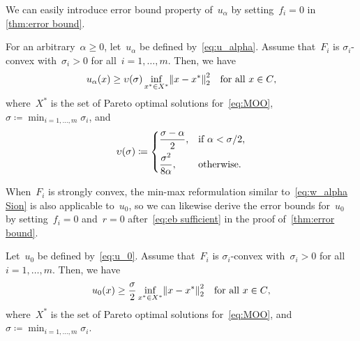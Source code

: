 \documentclass[../main]{subfiles}
\begin{document}
We can easily introduce error bound property of~$u_\alpha$ by setting~$f_i = 0$ in \cref{thm:error bound}.

\begin{corollary} \label{thm:eb_cor}
    For an arbitrary~$\alpha \ge 0$, let~$u_\alpha$ be defined by~\cref{eq:u_alpha}.
    Assume that~$F_i$ is $\sigma_i$-convex with~$\sigma_i > 0$ for all~$i = 1, \dots, m$.
    Then, we have
    \[
        u_\alpha(x) \ge \upsilon(\sigma) \inf_{x^\ast \in X^\ast} \norm*{x - x^\ast}_2^2 \forallcondition{x \in C}
    ,\]
    where~$X^\ast$ is the set of Pareto optimal solutions for~\cref{eq:MOO},~$\sigma \coloneqq \min_{i = 1, \dots, m} \sigma_i$, and
    \[
        \upsilon(\sigma) \coloneqq \begin{dcases}
            \frac{\sigma - \alpha}{2}, & \text{if } \alpha < \sigma / 2, \\
            \frac{\sigma^2}{8 \alpha}, & \text{otherwise}
        .\end{dcases}
    \] 
\end{corollary}

When~$F_i$ is strongly convex, the min-max reformulation similar to~\cref{eq:w_alpha Sion} is also applicable to~$u_0$, so we can likewise derive the error bounds for~$u_0$ by setting~$f_i = 0$ and~$r = 0$ after~\cref{eq:eb sufficient} in the proof of~\cref{thm:error bound}.
\begin{corollary}
    Let~$u_0$ be defined by~\cref{eq:u_0}.
    Assume that~$F_i$ is $\sigma_i$-convex with~$\sigma_i > 0$ for all~$i = 1, \dots, m$.
    Then, we have
    \[
        u_0(x) \ge \frac{\sigma}{2} \inf_{x^\ast \in X^\ast} \norm*{x - x^\ast}_2^2 \forallcondition{x \in C}
    ,\]
    where~$X^\ast$ is the set of Pareto optimal solutions for~\cref{eq:MOO}, and~$\sigma \coloneqq \min_{i = 1, \dots, m} \sigma_i$.
\end{corollary}
\end{document}
